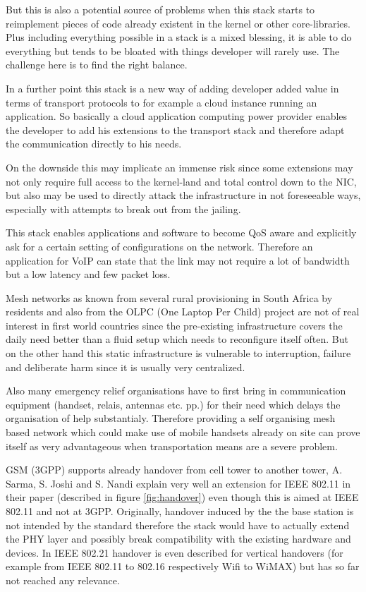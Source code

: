 \documentclass[twocolumn,english]{IEEEtran}
\theoremstyle{plain}
\theoremstyle{plain}
\begin{document}
But this is also a potential source of problems when this stack starts to
reimplement pieces of code already existent in the kernel or other
core-libraries. Plus including everything possible in a stack is a mixed
blessing, it is able to do everything but tends to be bloated with things
developer will rarely use. The challenge here is to find the right balance.

In a further point this stack is a new way of adding developer added value in
terms of transport protocols to for example a cloud instance running an
application. So basically a cloud application computing power provider
enables the developer to add his extensions to the transport stack and
therefore adapt the communication directly to his needs.

On the downside this may implicate an immense risk since some extensions may
not only require full access to the kernel-land and total control down to the
NIC, but also may be used to directly attack the infrastructure in not
foreseeable ways, especially with attempts to break out from the jailing.

This stack enables applications and software to become QoS aware and
explicitly ask for a certain setting of configurations on the network.
Therefore an application for VoIP can state that the link may not require a
lot of bandwidth but a low latency and few packet loss.

Mesh networks as known from several rural provisioning in South Africa by
residents and also from the OLPC (One Laptop Per
Child\cite{olpc:meshnetwork}) project are not of real interest in first world
countries since the pre-existing infrastructure covers the daily need better
than a fluid setup which needs to reconfigure itself often. But on the other
hand this static infrastructure is vulnerable to interruption, failure and
deliberate harm since it is usually very centralized.

Also many emergency relief organisations have to first bring in communication
equipment (handset, relais, antennas etc. pp.) for their need which delays the
organisation of help substantialy. Therefore providing a self organising mesh
based network which could make use of mobile handsets already on site can
prove itself as very advantageous when transportation means are a severe
problem.

GSM (3GPP) supports already handover from cell tower to another tower, A.
Sarma, S. Joshi and S. Nandi explain very well an extension for IEEE 802.11 in
their paper \cite{ijcn:ieee80211-handover} (described in figure
\ref{fig:handover}) even though this is aimed at IEEE 802.11 and not at 3GPP.
Originally, handover induced by the the base station is not intended by the
standard therefore the stack would have to actually extend the PHY layer and
possibly break compatibility with the existing hardware and devices. In IEEE
802.21 handover is even described for vertical handovers (for example from
IEEE 802.11 to 802.16 respectively Wifi to WiMAX) but has so far not reached
any relevance.
\end{document}
